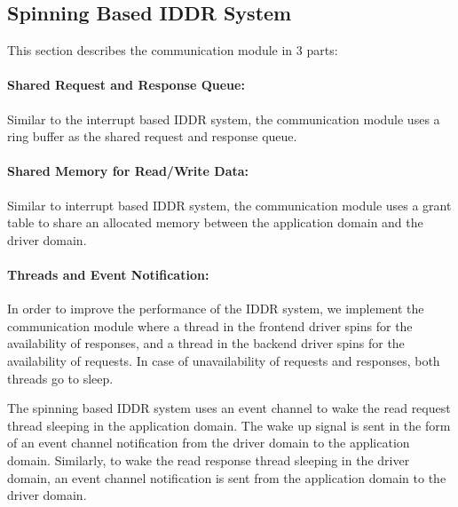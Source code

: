 \subsection*{Spinning Based IDDR System}
This section describes the communication module in 3 parts:

\paragraph{Shared Request and Response Queue:}
Similar to the interrupt based IDDR system, the communication module
uses a ring buffer as the shared request and response queue.

\paragraph{Shared Memory for Read/Write Data:}
Similar to interrupt based IDDR system, the communication module uses a
grant table to share an allocated memory between the application domain
and the driver domain.

\paragraph{Threads and Event Notification:}
In order to improve the performance of the IDDR system, we implement the
communication module where a thread in the frontend driver spins for the
availability of responses, and a thread in the backend driver spins for
the availability of requests. In case of unavailability of requests and
responses, both threads go to sleep.

The spinning based IDDR system uses an event channel to wake the read
request thread sleeping in the application domain. The wake up signal
is sent in the form of an event channel notification from the driver
domain to the application domain. Similarly, to wake the read response
thread sleeping in the driver domain, an event channel notification is
sent from the application domain to the driver domain.

